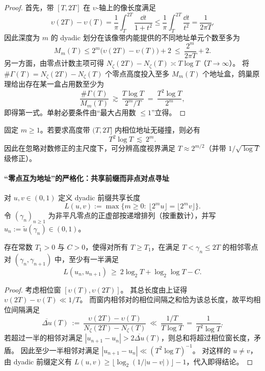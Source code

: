 \begin{proof}
首先，带 \([T,2T]\) 在 \(\upsilon\)-轴上的像长度满足
\[
\upsilon(2T)-\upsilon(T)=\frac{1}{\pi}\int_T^{2T}\frac{\dd t}{1+t^2}
\le \frac{1}{\pi}\int_T^{2T}\frac{\dd t}{t^2}
=\frac{1}{2\pi T}.
\]
因此深度为 \(m\) 的 dyadic 划分在该像带内能提供的不同地址单元个数至多为
\[
M_m(T)\le 2^m\bigl(\upsilon(2T)-\upsilon(T)\bigr)+2\ \le\ \frac{2^m}{2\pi T}+2.
\]
另一方面，由零点计数主项可得 \(N_\zeta(2T)-N_\zeta(T)\asymp T\log T\)（\(T\to\infty\)）。
将 \(\#\Gamma(T)=N_\zeta(2T)-N_\zeta(T)\) 个零点高度投入至多 \(M_m(T)\) 个地址盒，鸽巢原理给出存在某一盒占用数至少为
\[
\frac{\#\Gamma(T)}{M_m(T)}\ \gtrsim\ \frac{T\log T}{2^m/T}\ =\ \frac{T^2\log T}{2^m},
\]
即得第一式。单射必要条件由“最大占用数 \(\le 1\)”立得。
\end{proof}

\begin{corollary}\label{cor:xi-phase-prefix-clarity-horizon}
固定 \(m\ge 1\)。若要求高度带 \((T,2T]\) 内相位地址无碰撞，则必有
\[
T^2\log T\ \lesssim\ 2^m.
\]
因此在忽略对数修正的主尺度下，可分辨高度视界满足 \(T\approx 2^{m/2}\)（并带 \(1/\sqrt{\log T}\) 级修正）。
\end{corollary}



\paragraph{“零点互为地址”的严格化：共享前缀而非点对点寻址}
对 \(u,v\in(0,1)\) 定义 dyadic 前缀共享长度
\[
L(u,v):=\max\{m\ge 0:\ \lfloor 2^m u\rfloor=\lfloor 2^m v\rfloor\}.
\]
令 \((\gamma_n)_{n\ge 1}\) 为非平凡零点的正虚部按递增排列（按重数计），并写 \(u_n:=\widetilde u(\gamma_n)\in(0,1)\)。

\begin{proposition}\label{prop:xi-phase-adjacent-prefix-sharing}
存在常数 \(T_1>0\) 与 \(C>0\)，使得对所有 \(T\ge T_1\)，在满足 \(T<\gamma_n\le 2T\) 的相邻零点对 \((\gamma_n,\gamma_{n+1})\) 中，至少有一半满足
\[
L(u_n,u_{n+1})\ \ge\ 2\log_2 T+\log_2\log T - C.
\]
\end{proposition}

\begin{proof}
考虑相位窗 \([\upsilon(T),\upsilon(2T)]\)。
其总长度由上证得 \(\upsilon(2T)-\upsilon(T)\ll 1/T\)。
而窗内相邻对的相位间隔之和恰为该总长度，故平均相位间隔满足
\[
\overline{\Delta u}(T)\ :=\ \frac{\upsilon(2T)-\upsilon(T)}{N_\zeta(2T)-N_\zeta(T)}\ \ll\ \frac{1/T}{T\log T}\ =\ \frac{1}{T^2\log T}.
\]
若超过一半的相邻对满足 \(|u_{n+1}-u_n|>2\overline{\Delta u}(T)\)，则总和将超过相位窗长度，矛盾。
因此至少一半相邻对满足 \(|u_{n+1}-u_n|\ll (T^2\log T)^{-1}\)。
对这样的 \(u\neq v\)，由 dyadic 前缀定义有 \(L(u,v)\ge \lfloor \log_2(1/|u-v|)\rfloor -1\)，代入即得结论。
\end{proof}

